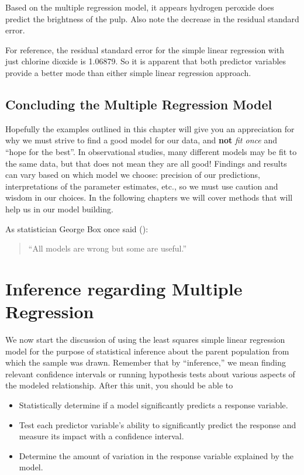 \documentclass[
]{book}
\providecommand{\tightlist}{%
  \setlength{\itemsep}{0pt}\setlength{\parskip}{0pt}}
\begin{document}
Based on the multiple regression model, it appears hydrogen peroxide does predict the brightness of the pulp.
Also note the decrease in the residual standard error.

For reference, the residual standard error for the simple linear regression with just chlorine dioxide is 1.06879.
So it is apparent that both predictor variables provide a better mode than either simple linear regression approach.

\hypertarget{concluding-the-multiple-regression-model}{%
\section{Concluding the Multiple Regression Model}\label{concluding-the-multiple-regression-model}}

Hopefully the examples outlined in this chapter will give you an appreciation for why we must strive to find a good model for our data, and \textbf{not} \emph{fit once} and ``hope for the best''.
In observational studies, many different models may be fit to the same data, but that does not mean they are all good!
Findings and results can vary based on which model we choose: precision of our predictions, interpretations of the parameter estimates, etc., so we must use caution and wisdom in our choices.
In the following chapters we will cover methods that will help us in our model building.

As statistician George Box once said (\citet{Box1979}):

\begin{quote}
``All models are wrong but some are useful.''
\end{quote}

\hypertarget{regInferenceChp}{%
\chapter{Inference regarding Multiple Regression}\label{regInferenceChp}}

We now start the discussion of using the least squares simple linear regression model for the purpose of statistical inference about the parent population from which the sample was drawn.
Remember that by ``inference,'' we mean finding relevant confidence intervals or running hypothesis tests about various aspects of the modeled relationship.
After this unit, you should be able to

\begin{itemize}
\tightlist
\item
  Statistically determine if a model significantly predicts a response variable.
\item
  Test each predictor variable's ability to significantly predict the response and measure its impact with a confidence interval.
\item
  Determine the amount of variation in the response variable explained by the model.
\end{itemize}
\end{document}
